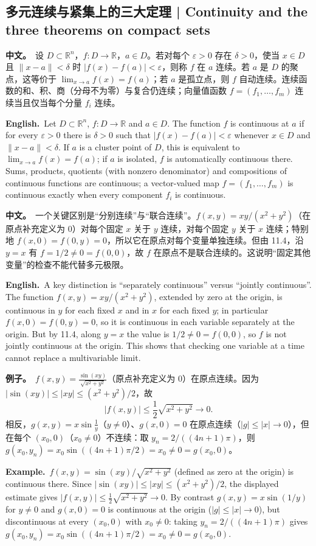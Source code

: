 \documentclass[UTF8,11pt,a4paper]{ctexart}
\newcommand{\BOTH}[2]{\par\noindent\textbf{中文。}\ #1\par\noindent\textbf{English.}\ #2\par}
\newcommand{\EX}[2]{\par\noindent\textbf{例子。}\ #1\par\noindent\textbf{Example.}\ #2\par}
\begin{document}
\subsection{多元连续与紧集上的三大定理 | Continuity and the three theorems on compact sets}
\BOTH{设 $D\subset\mathbb R^n$，$f:D\to\mathbb R$，$a\in D$。若对每个 $\varepsilon>0$ 存在 $\delta>0$，使当 $x\in D$ 且 $\|x-a\|<\delta$ 时 $|f(x)-f(a)|<\varepsilon$，则称 $f$ 在 $a$ 连续。若 $a$ 是 $D$ 的聚点，这等价于 $\lim_{x\to a}f(x)=f(a)$；若 $a$ 是孤立点，则 $f$ 自动连续。连续函数的和、积、商（分母不为零）与复合仍连续；向量值函数 $f=(f_1,\dots,f_m)$ 连续当且仅当每个分量 $f_i$ 连续。}{Let $D\subset\mathbb R^n$, $f:D\to\mathbb R$ and $a\in D$. The function $f$ is continuous at $a$ if for every $\varepsilon>0$ there is $\delta>0$ such that $|f(x)-f(a)|<\varepsilon$ whenever $x\in D$ and $\|x-a\|<\delta$. If $a$ is a cluster point of $D$, this is equivalent to $\lim_{x\to a}f(x)=f(a)$; if $a$ is isolated, $f$ is automatically continuous there. Sums, products, quotients (with nonzero denominator) and compositions of continuous functions are continuous; a vector-valued map $f=(f_1,\dots,f_m)$ is continuous exactly when every component $f_i$ is continuous.}
\BOTH{一个关键区别是“分别连续”与“联合连续”。$f(x,y)=xy/(x^2+y^2)$（在原点补充定义为 $0$）对每个固定 $x$ 关于 $y$ 连续，对每个固定 $y$ 关于 $x$ 连续；特别地 $f(x,0)=f(0,y)=0$，所以它在原点对每个变量单独连续。但由 11.4，沿 $y=x$ 有 $f=1/2\ne0=f(0,0)$，故 $f$ 在原点不是联合连续的。这说明“固定其他变量”的检查不能代替多元极限。}{A key distinction is “separately continuous” versus “jointly continuous”. The function $f(x,y)=xy/(x^2+y^2)$, extended by zero at the origin, is continuous in $y$ for each fixed $x$ and in $x$ for each fixed $y$; in particular $f(x,0)=f(0,y)=0$, so it is continuous in each variable separately at the origin. But by 11.4, along $y=x$ the value is $1/2\ne0=f(0,0)$, so $f$ is not jointly continuous at the origin. This shows that checking one variable at a time cannot replace a multivariable limit.}
\EX{$\displaystyle f(x,y)=\frac{\sin(xy)}{\sqrt{x^2+y^2}}$（原点补充定义为 $0$）在原点连续。因为 $|\sin(xy)|\le|xy|\le(x^2+y^2)/2$，故
\[
|f(x,y)|\le\frac12\sqrt{x^2+y^2}\to0 .
\]
相反，$\displaystyle g(x,y)=x\sin\frac1y$（$y\ne0$）、$g(x,0)=0$ 在原点连续（$|g|\le|x|\to0$），但在每个 $(x_0,0)$（$x_0\ne0$）不连续：取 $y_n=2/((4n+1)\pi)$，则 $g(x_0,y_n)=x_0\sin((4n+1)\pi/2)=x_0\ne0=g(x_0,0)$。}{$\displaystyle f(x,y)=\sin(xy)/\sqrt{x^2+y^2}$ (defined as zero at the origin) is continuous there. Since $|\sin(xy)|\le|xy|\le(x^2+y^2)/2$, the displayed estimate gives $|f(x,y)|\le\frac12\sqrt{x^2+y^2}\to0$. By contrast $\displaystyle g(x,y)=x\sin(1/y)$ for $y\ne0$ and $g(x,0)=0$ is continuous at the origin ($|g|\le|x|\to0$), but discontinuous at every $(x_0,0)$ with $x_0\ne0$: taking $y_n=2/((4n+1)\pi)$ gives $g(x_0,y_n)=x_0\sin((4n+1)\pi/2)=x_0\ne0=g(x_0,0)$.}
\end{document}
